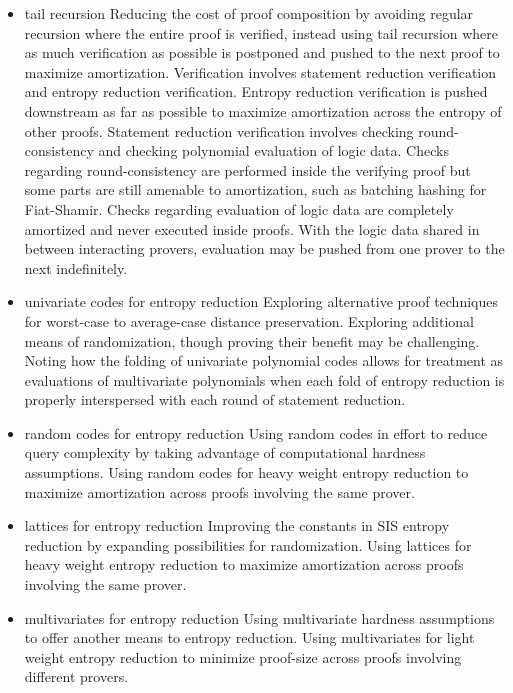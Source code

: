\begin{itemize}
    \item{tail recursion}
    Reducing the cost of proof composition by avoiding regular recursion where the entire proof is verified, instead using tail recursion where as much verification as possible is postponed and pushed to the next proof to maximize amortization.
    Verification involves statement reduction verification and entropy reduction verification. 
    Entropy reduction verification is pushed downstream as far as possible to maximize amortization across the entropy of other proofs.
    Statement reduction verification involves checking round-consistency and checking polynomial evaluation of logic data.
    Checks regarding round-consistency are performed inside the verifying proof but some parts are still amenable to amortization, such as batching hashing for Fiat-Shamir.
    Checks regarding evaluation of logic data are completely amortized and never executed inside proofs.
    With the logic data shared in between interacting provers, evaluation may be pushed from one prover to the next indefinitely.

    \item{univariate codes for entropy reduction}
    Exploring alternative proof techniques for worst-case to average-case distance preservation.
    Exploring additional means of randomization, though proving their benefit may be challenging.
    Noting how the folding of univariate polynomial codes allows for treatment as evaluations of multivariate polynomials when each fold of entropy reduction is properly interspersed with each round of statement reduction.

    \item{random codes for entropy reduction}
    Using random codes in effort to reduce query complexity by taking advantage of computational hardness assumptions.
    Using random codes for heavy weight entropy reduction to maximize amortization across proofs involving the same prover.

    \item{lattices for entropy reduction}
    Improving the constants in SIS entropy reduction by expanding possibilities for randomization.
    Using lattices for heavy weight entropy reduction to maximize amortization across proofs involving the same prover.

    \item{multivariates for entropy reduction}
    Using multivariate hardness assumptions to offer another means to entropy reduction.
    Using multivariates for light weight entropy reduction to minimize proof-size across proofs involving different provers.


\end{itemize}
